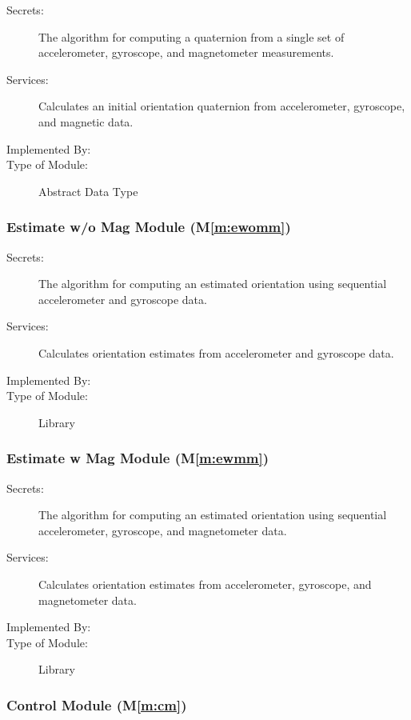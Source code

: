 \documentclass[12pt, titlepage]{article}
\newcommand{\mref}[1]{M\ref{#1}}
\begin{document}
\begin{description}
\item[Secrets:] The algorithm for computing a quaternion from a single set of accelerometer, gyroscope, and magnetometer measurements.
\item[Services:] Calculates an initial orientation quaternion from accelerometer, gyroscope, and magnetic data.
\item[Implemented By:] \progname
\item[Type of Module:] Abstract Data Type
\end{description}

\subsubsection{Estimate w/o Mag Module (\mref{m:ewomm})}

\begin{description}
\item[Secrets:] The algorithm for computing an estimated orientation using sequential accelerometer and gyroscope data.
\item[Services:] Calculates orientation estimates from accelerometer and gyroscope data.
\item[Implemented By:] \progname
\item[Type of Module:] Library
\end{description}

\subsubsection{Estimate w Mag Module (\mref{m:ewmm})}

\begin{description}
\item[Secrets:] The algorithm for computing an estimated orientation using sequential accelerometer, gyroscope, and magnetometer data.
\item[Services:] Calculates orientation estimates from accelerometer, gyroscope, and magnetometer data.
\item[Implemented By:] \progname
\item[Type of Module:] Library
\end{description}

\subsubsection{Control Module (\mref{m:cm})}
\end{document}
